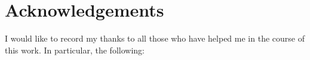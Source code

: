 \chapter*{Acknowledgements}

\noindent

\normalsize

I would like to record my thanks to all those who have helped me in the
course of this work. In particular, the following:




